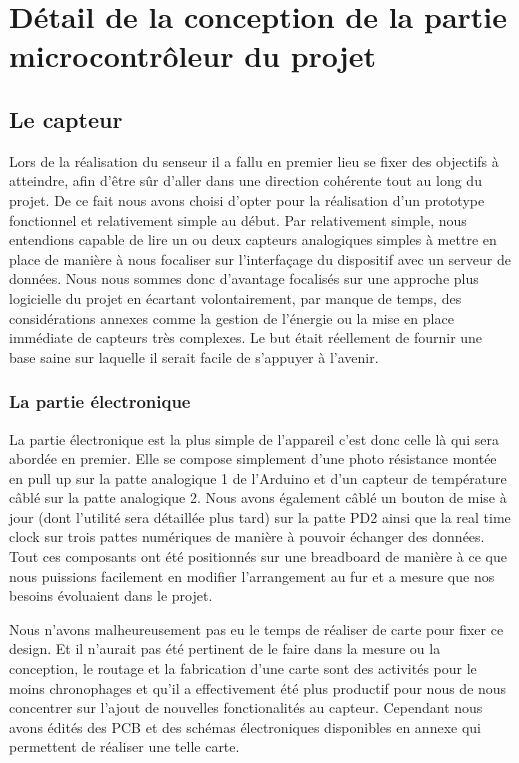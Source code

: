 \section{Détail de la conception de la partie microcontrôleur du projet}
	\subsection{Le capteur}
		Lors de la réalisation du senseur il a fallu en premier lieu se fixer
		des objectifs à atteindre, afin d'être sûr d'aller dans une direction
		cohérente tout au long du projet. De  ce fait nous avons choisi d'opter pour
		la réalisation d'un prototype fonctionnel et relativement simple au début.
		Par relativement simple, nous entendions capable de lire un ou deux capteurs
		analogiques simples à mettre en place de manière à nous focaliser sur
		l'interfaçage du dispositif avec un serveur de données. Nous nous sommes
		donc d'avantage focalisés sur une approche plus logicielle du projet en
		écartant volontairement, par manque de temps, des considérations annexes
		comme la gestion de l'énergie ou la mise en place immédiate de capteurs
		très complexes. Le but était réellement de fournir une base saine sur laquelle
		il serait facile de s'appuyer à l'avenir.
		
		\subsubsection{La partie électronique}
		
		La partie électronique est la plus simple de l'appareil c'est donc celle
		là qui sera abordée en premier. Elle se compose simplement d'une photo résistance
		montée en pull up sur la patte analogique 1 de l'Arduino et d'un capteur de
		température câblé sur la patte analogique 2. Nous avons également câblé un bouton de
		mise à jour (dont l'utilité sera détaillée plus tard) sur la patte PD2
		ainsi que la real time clock sur trois pattes numériques de manière à pouvoir
		échanger des données. Tout ces composants ont été positionnés sur une breadboard
		de manière à ce que nous puissions facilement en modifier l'arrangement au fur et a mesure
		que nos besoins évoluaient dans le projet.
		\par
		Nous n'avons malheureusement pas eu le temps de réaliser de carte
		pour fixer ce design. Et il n'aurait pas été pertinent de le faire dans la mesure
		ou la conception, le routage et la fabrication d'une carte sont des activités pour
		le moins chronophages et qu'il a effectivement été plus productif pour nous de nous
		concentrer sur l'ajout de nouvelles fonctionalités au capteur. Cependant
		nous avons édités des PCB et des schémas électroniques disponibles en
		annexe qui permettent de réaliser une telle carte.
		
